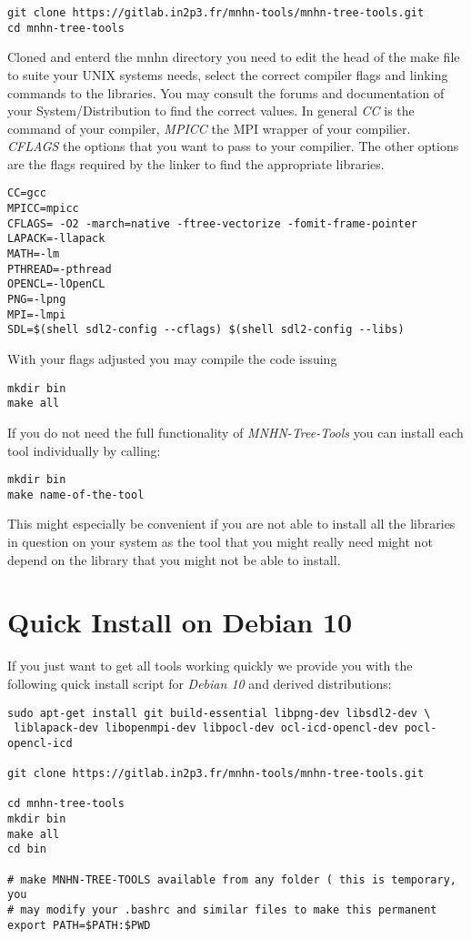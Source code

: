 \begin{lstlisting}                                                              
git clone https://gitlab.in2p3.fr/mnhn-tools/mnhn-tree-tools.git
cd mnhn-tree-tools
\end{lstlisting}
Cloned and enterd the mnhn directory you need to edit the head of the
make file to suite your UNIX systems needs, select the correct compiler
flags and linking commands to the libraries. You may consult the
forums and documentation of your System/Distribution to find the
correct values. In general \emph{CC} is the command of your compiler,
\emph{MPICC} the MPI wrapper of your compilier. \emph{CFLAGS} the
options that you want to pass to your compilier. The other options are
the flags required by the linker to find the appropriate libraries.
\begin{lstlisting}                                                           
CC=gcc
MPICC=mpicc
CFLAGS= -O2 -march=native -ftree-vectorize -fomit-frame-pointer 
LAPACK=-llapack
MATH=-lm
PTHREAD=-pthread
OPENCL=-lOpenCL
PNG=-lpng
MPI=-lmpi
SDL=$(shell sdl2-config --cflags) $(shell sdl2-config --libs)
\end{lstlisting}
With your flags adjusted you may compile the code issuing
\begin{lstlisting}
mkdir bin
make all
\end{lstlisting}
If you do not need the full functionality of \emph{MNHN-Tree-Tools} you can
install each tool individually by calling:
\begin{lstlisting}
mkdir bin
make name-of-the-tool
\end{lstlisting}
This might especially be convenient if you are not able to install all
the libraries in question on your system as the tool that you might
really need might not depend on the library that you might not be able
to install.

\section{Quick Install on Debian 10}
If you just want to get all tools working quickly we provide you with the
following quick install script for \emph{Debian 10} and derived distributions:

\begin{lstlisting}
sudo apt-get install git build-essential libpng-dev libsdl2-dev \
 liblapack-dev libopenmpi-dev libpocl-dev ocl-icd-opencl-dev pocl-opencl-icd

git clone https://gitlab.in2p3.fr/mnhn-tools/mnhn-tree-tools.git

cd mnhn-tree-tools
mkdir bin
make all
cd bin

# make MNHN-TREE-TOOLS available from any folder ( this is temporary, you
# may modify your .bashrc and similar files to make this permanent
export PATH=$PATH:$PWD
\end{lstlisting}
